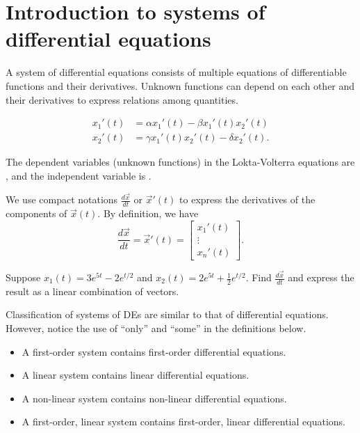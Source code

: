 \documentclass[../main.tex]{subfiles}
\begin{document}
 \section{Introduction to systems of differential equations}

A system of differential equations consists of multiple equations of differentiable functions and their derivatives.  Unknown functions can depend on each other and their derivatives to express relations among quantities.

\begin{example}
  \begin{align*}
    x_{1}'(t) &= \alpha x_{1}'(t) - \beta x_{1}'(t) x_{2}'(t) \\
    x_{2}'(t) &= \gamma x_{1}'(t) x_{2}'(t) - \delta x_{2}'(t).
  \end{align*}

  The dependent variables (unknown functions) in the Lokta-Volterra equations are \underline{\hspace{1in}}, and the independent variable is \underline{\hspace{1cm}}.
\end{example}

We use compact notations \(\frac{d \vec{x}}{dt}\) or \(\vec{x}'(t)\) to express the derivatives of the components of \(\vec{x}(t)\).   By definition, we have
\[
  \frac{d \vec{x}}{dt} = \vec{x}'(t) = \begin{bmatrix} x_{1}'(t) \\ \vdots \\ x_{n}'(t)\end{bmatrix}.
\]


\begin{example}
  Suppose \(x_{1}(t) = 3 e^{5t} -2 e^{t/2}\) and \(x_{2}(t) = 2 e^{5t} + \frac{1}{2}e^{t/2}\). Find \(\frac{d \vec{x}}{dt}\) and express the result as a linear combination of vectors.

\end{example}

Classification of systems of DEs are similar to that of differential equations. However, notice the use of ``only'' and ``some'' in the definitions below.
\begin{itemize}
  \item A first-order system contains  first-order differential equations.
  \item A linear system contains   linear differential equations.
  \item A non-linear system contains  non-linear differential equations.
  \item A first-order, linear system contains  first-order, linear differential equations.
\end{itemize}
\end{document}

